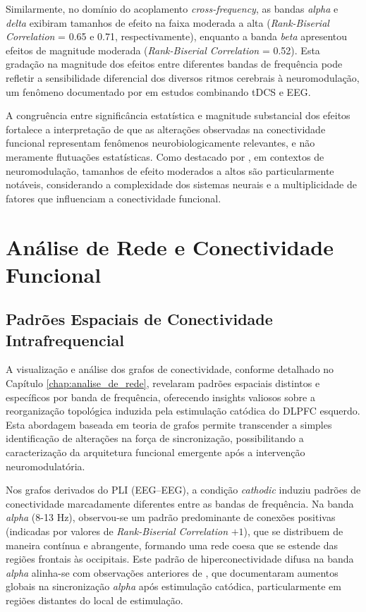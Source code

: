 Similarmente, no domínio do acoplamento \textit{cross-frequency}, as bandas \emph{alpha} e \emph{delta} exibiram tamanhos de efeito na faixa moderada a alta (\textit{Rank-Biserial Correlation} = 0.65 e 0.71, respectivamente), enquanto a banda \emph{beta} apresentou efeitos de magnitude moderada (\textit{Rank-Biserial Correlation} = 0.52). Esta gradação na magnitude dos efeitos entre diferentes bandas de frequência pode refletir a sensibilidade diferencial dos diversos ritmos cerebrais à neuromodulação, um fenômeno documentado por \cite{kunze2014high} em estudos combinando tDCS e EEG.

A congruência entre significância estatística e magnitude substancial dos efeitos fortalece a interpretação de que as alterações observadas na conectividade funcional representam fenômenos neurobiologicamente relevantes, e não meramente flutuações estatísticas. Como destacado por \cite{singh2024evaluating}, em contextos de neuromodulação, tamanhos de efeito moderados a altos são particularmente notáveis, considerando a complexidade dos sistemas neurais e a multiplicidade de fatores que influenciam a conectividade funcional.

\section{Análise de Rede e Conectividade Funcional}

\subsection{Padrões Espaciais de Conectividade Intrafrequencial}
A visualização e análise dos grafos de conectividade, conforme detalhado no Capítulo \ref{chap:analise_de_rede}, revelaram padrões espaciais distintos e específicos por banda de frequência, oferecendo insights valiosos sobre a reorganização topológica induzida pela estimulação catódica do DLPFC esquerdo. Esta abordagem baseada em teoria de grafos permite transcender a simples identificação de alterações na força de sincronização, possibilitando a caracterização da arquitetura funcional emergente após a intervenção neuromodulatória.

Nos grafos derivados do PLI (EEG--EEG), a condição \emph{cathodic} induziu padrões de conectividade marcadamente diferentes entre as bandas de frequência. Na banda \emph{alpha} (8-13 Hz), observou-se um padrão predominante de conexões positivas (indicadas por valores de \textit{Rank-Biserial Correlation} $+1$), que se distribuem de maneira contínua e abrangente, formando uma rede coesa que se estende das regiões frontais às occipitais. Este padrão de hiperconectividade difusa na banda \emph{alpha} alinha-se com observações anteriores de \cite{kunze2014high}, que documentaram aumentos globais na sincronização \emph{alpha} após estimulação catódica, particularmente em regiões distantes do local de estimulação.

